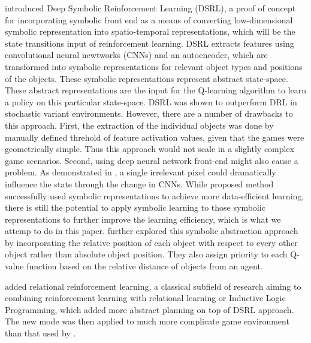 \documentclass[12pt,twoside]{report}
\begin{document}
 \cite{Garnelo2016} introduced Deep Symbolic Reinforcement Learning (DSRL), a proof of concept for incorporating symbolic front end as a means of converting low-dimensional symbolic representation into spatio-temporal representations, which will be the state transitions input of reinforcement learning. DSRL extracts features using convolutional neural newtworks (CNNs) \cite{LeCunL1998} and an autoencoder, which are transformed into symbolic representations for relevant object types and positions of the objects. These symbolic representations represent abstract state-space. These abstract representations are the input for the Q-learning algorithm to learn a policy on this particular state-space. DSRL was shown to outperform DRL in stochastic variant environments.
However, there are a number of drawbacks to this approach. First, the extraction of the individual objects was done by manually defined threhold of feature activation values, given that the games were geometrically simple. Thus this approach would not scale in a slightly complex game scenarios. Second, using deep neural network front-end might also cause a problem. As demonstrated in \cite{Su2017}, a single irrelevant pixel could dramatically influence the state through the change in CNNs.
While proposed method successfully used symbolic representations to achieve more data-efficient learning, there is still the potential to apply symbolic learning to those symbolic representations to further improve the learning efficiency, which is what we attemp to do in this paper.
\cite{Garcez2018} further explored this symbolic abstraction approach by incorporating the relative position of each object with respect to every other object rather than absolute object position. They also assign priority to each Q-value function based on the relative distance of objects from an agent.

\cite{Zambaldi2018} added relational reinforcement learning, a classical subfield of research aiming to combining reinforcement learning with relational learning or Inductive Logic Programming,  which added more abstract planning on top of DSRL approach. The new mode was then applied to much more complicate game environment than that used by \cite{Garnelo2016}.


\end{document}
